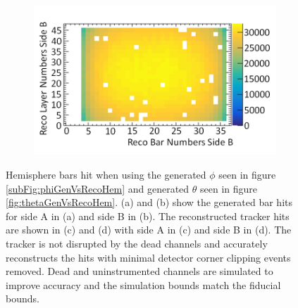\begin{figure}[!h]
\begin{subfigure}{.5\textwidth}
  \captionsetup{width=.9\linewidth}
  \caption{}
  \label{subFig:hemisphereFiducialBarsSideA}
\end{subfigure}%
\begin{subfigure}{.5\textwidth}
  \centering
\includegraphics[width=\linewidth]{Chapter6/Figs/Raster/hemisphereFiducialBarsSideBMedText.png}
  \captionsetup{width=.9\linewidth}
  \caption{}
  \label{subFig:hemisphereFiducialBarsSideB}
\end{subfigure}
\caption{Hemisphere bars hit when using the generated $\phi$ seen in figure \ref{subFig:phiGenVsRecoHem} and generated $\theta$ seen in figure \ref{fig:thetaGenVsRecoHem}. (a) and (b) show the generated bar hits for side A in (a) and side B in (b). The reconstructed tracker hits are shown in (c) and (d) with side A in (c) and side B in (d). The tracker is not disrupted by the dead channels and accurately reconstructs the hits with minimal detector corner clipping events removed. Dead and uninstrumented channels are simulated to improve accuracy and the simulation bounds match the fiducial bounds.}
\label{fig:HemisphereFiducialBarsSideAB}
\end{figure}

